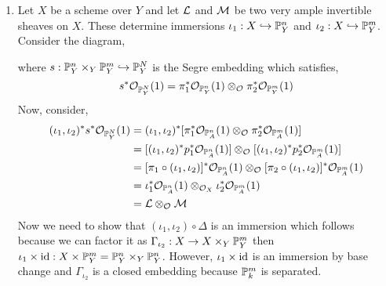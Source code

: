 \documentclass[12pt]{article}
\begin{document}
\begin{enumerate}
\item Let $X$ be a scheme over $Y$ and let $\L$ and $\M$ be two very ample invertible sheaves on $X$. These determine immersions $\iota_1 : X \embed \P^n_Y$ and $\iota_2 : X \embed \P^m_Y$. Consider the diagram,
\begin{center}
\end{center}
where $s : \P^n_Y \times_Y \P^m_Y \embed \P^{N}_Y$ is the Segre embedding which satisfies,
\[ s^* \struct{\P^{N}_Y}(1) = \pi_1^* \struct{\P^n_Y}(1) \otimes_{\struct{}} \pi_2^* \struct{\P^m_Y}(1) \]
Now, consider,
\begin{align*}
(\iota_1, \iota_2)^* s^* \struct{\P^N_Y}(1) & = (\iota_1, \iota_2)^* [\pi_1^* \struct{\P^n_A}(1) \otimes_{\struct{}} \pi_2^* \struct{\P^m_A}(1)] 
\\
& = [(\iota_1, \iota_2)^* p_1^* \struct{\P^n_A}(1)] \otimes_{\struct{}} [(\iota_1, \iota_2)^* p_2^* \struct{\P^m_A}(1)] 
\\
& = [\pi_1 \circ (\iota_1, \iota_2)]^* \struct{\P^n_A}(1) \otimes_{\struct{}} [\pi_2 \circ (\iota_1, \iota_2)]^* \struct{\P^m_A}(1)
\\
& = \iota_1^* \struct{\P^n_A}(1) \otimes_{\struct{X}} \iota_2^* \struct{\P^m_A}(1)
\\
& = \L \otimes_{\struct{}} \M 
\end{align*}
Now we need to show that $(\iota_1, \iota_2) \circ \Delta$ is an immersion which follows because we can factor it as $\Gamma_{\iota_2} : X \to X \times_Y \P^m_Y$ then $\iota_1 \times \id : X \times \P^m_Y = \P^n_Y \times_Y \P^n_Y$. However, $\iota_1 \times \id$ is an immersion by base change and $\Gamma_{\iota_2}$ is a closed embedding because $\P^m_k$ is separated.


\end{enumerate}
\end{document}
